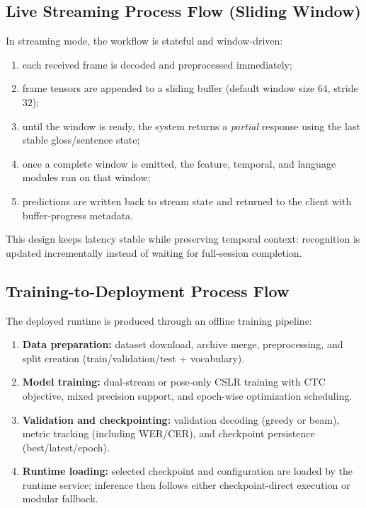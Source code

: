 \subsection{Live Streaming Process Flow (Sliding Window)}
In streaming mode, the workflow is stateful and window-driven:
\begin{enumerate}[leftmargin=1.5em]
\item each received frame is decoded and preprocessed immediately;
\item frame tensors are appended to a sliding buffer (default window size $64$, stride $32$);
\item until the window is ready, the system returns a \emph{partial} response using the last stable gloss/sentence state;
\item once a complete window is emitted, the feature, temporal, and language modules run on that window;
\item predictions are written back to stream state and returned to the client with buffer-progress metadata.
\end{enumerate}

This design keeps latency stable while preserving temporal context: recognition is updated incrementally instead of waiting for full-session completion.

\subsection{Training-to-Deployment Process Flow}
The deployed runtime is produced through an offline training pipeline:
\begin{enumerate}[leftmargin=1.5em]
\item \textbf{Data preparation:} dataset download, archive merge, preprocessing, and split creation (train/validation/test + vocabulary).
\item \textbf{Model training:} dual-stream or pose-only CSLR training with CTC objective, mixed precision support, and epoch-wise optimization scheduling.
\item \textbf{Validation and checkpointing:} validation decoding (greedy or beam), metric tracking (including WER/CER), and checkpoint persistence (best/latest/epoch).
\item \textbf{Runtime loading:} selected checkpoint and configuration are loaded by the runtime service; inference then follows either checkpoint-direct execution or modular fallback.
\end{enumerate}


